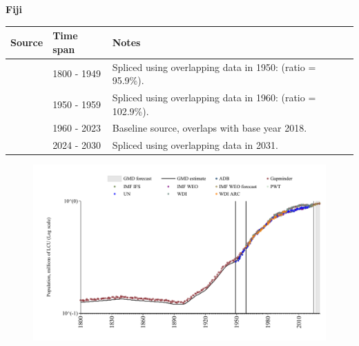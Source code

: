\documentclass[12pt,a4paper,landscape]{article}
\begin{document}
\begin{adjustbox}{max totalsize={\paperwidth}{\paperheight},center}
\begin{minipage}[t][\textheight][t]{\textwidth}
\vspace*{0.5cm}
{}
\begin{center}
{\Large\bfseries Fiji}
\end{center}
\vspace{0.5cm}
\begin{table}[H]
\centering
\small
\begin{tabular}{|l|l|l|}
\hline
\textbf{Source} & \textbf{Time span} & \textbf{Notes} \\
\hline
\rowcolor{white}\cite{Gapminder}& 1800 - 1949 &Spliced using overlapping data in 1950: (ratio = 95.9\%).\\
\rowcolor{lightgray}\cite{IMF_IFS}& 1950 - 1959 &Spliced using overlapping data in 1960: (ratio = 102.9\%).\\
\rowcolor{white}\cite{WDI}& 1960 - 2023 &Baseline source, overlaps with base year 2018.\\
\rowcolor{lightgray}\cite{Gapminder}& 2024 - 2030 &Spliced using overlapping data in 2031.\\
\hline
\end{tabular}
\end{table}
\begin{figure}[H]
\centering
\includegraphics[width=\textwidth,height=0.6\textheight,keepaspectratio]{graphs/FJI_pop.pdf}
\end{figure}
\end{minipage}
\end{adjustbox}
\end{document}
